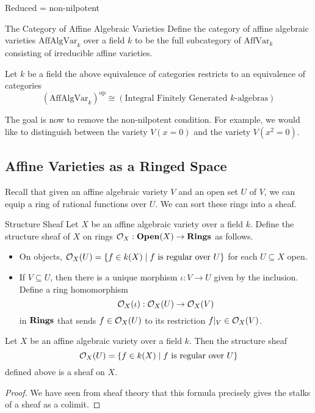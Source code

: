 \documentclass[a4paper]{article}
\begin{document}
Reduced = non-nilpotent

\begin{defn}{The Category of Affine Algebraic Varieties}{} Define the category of affine algebraic varieties $\text{AffAlgVar}_k$ over a field $k$ to be the full subcategory of $\text{AffVar}_k$ consisting of irreducible affine varieties. 
\end{defn}

\begin{prp}{}{} Let $k$ be a field the above equivalence of categories restricts to an equivalence of categories $$(\text{AffAlgVar}_k)^\text{op}\cong(\text{Integral Finitely Generated }k\text{-algebras})$$
\end{prp}

The goal is now to remove the non-nilpotent condition. For example, we would like to distinguish between the variety $V(x=0)$ and the variety $V(x^2=0)$. 

\subsection{Affine Varieties as a Ringed Space}
Recall that given an affine algebraic variety $V$ and an open set $U$ of $V$, we can equip a ring of rational functions over $U$. We can sort these rings into a sheaf. 

\begin{defn}{Structure Sheaf}{} Let $X$ be an affine algebraic variety over a field $k$. Define the structure sheaf of $X$ on rings $\mathcal{O}_X:\bold{Open}(X)\to\bold{Rings}$ as follows. 
\begin{itemize}
\item On objects, $\mathcal{O}_X(U)=\{f\in k(X)\;|\;f\text{ is regular over }U\}$ for each $U\subseteq X$ open. 
\item If $V\subseteq U$, then there is a unique morphism $\iota:V\to U$ given by the inclusion. Define a ring homomorphism $$\mathcal{O}_X(\iota):\mathcal{O}_X(U)\to\mathcal{O}_X(V)$$ in $\bold{Rings}$ that sends $f\in\mathcal{O}_X(U)$ to its restriction $f|_V\in\mathcal{O}_X(V)$. 
\end{itemize}
\end{defn}

\begin{thm}{}{} Let $X$ be an affine algebraic variety over a field $k$. Then the structure sheaf $$\mathcal{O}_X(U)=\{f\in k(X)\;|\;f\text{ is regular over }U\}$$ defined above is a sheaf on $X$. \tcbline
\begin{proof}
We have seen from sheaf theory that this formula precisely gives the stalks of a sheaf as a colimit. 
\end{proof}
\end{thm}
\end{document}
